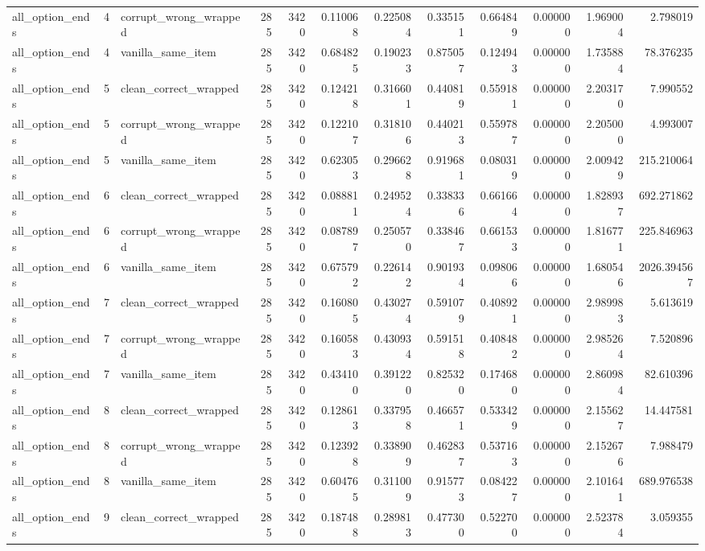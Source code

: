 \begin{tabular}{lrlrrrrrrrrr}
all\_option\_ends & 4 & corrupt\_wrong\_wrapped & 285 & 3420 & 0.110068 & 0.225084 & 0.335151 & 0.664849 & 0.000000 & 1.969004 & 2.798019 \\
all\_option\_ends & 4 & vanilla\_same\_item & 285 & 3420 & 0.684825 & 0.190233 & 0.875057 & 0.124943 & 0.000000 & 1.735884 & 78.376235 \\
all\_option\_ends & 5 & clean\_correct\_wrapped & 285 & 3420 & 0.124218 & 0.316601 & 0.440819 & 0.559181 & 0.000000 & 2.203170 & 7.990552 \\
all\_option\_ends & 5 & corrupt\_wrong\_wrapped & 285 & 3420 & 0.122107 & 0.318106 & 0.440213 & 0.559787 & 0.000000 & 2.205000 & 4.993007 \\
all\_option\_ends & 5 & vanilla\_same\_item & 285 & 3420 & 0.623053 & 0.296628 & 0.919681 & 0.080319 & 0.000000 & 2.009429 & 215.210064 \\
all\_option\_ends & 6 & clean\_correct\_wrapped & 285 & 3420 & 0.088811 & 0.249524 & 0.338336 & 0.661664 & 0.000000 & 1.828937 & 692.271862 \\
all\_option\_ends & 6 & corrupt\_wrong\_wrapped & 285 & 3420 & 0.087897 & 0.250570 & 0.338467 & 0.661533 & 0.000000 & 1.816771 & 225.846963 \\
all\_option\_ends & 6 & vanilla\_same\_item & 285 & 3420 & 0.675792 & 0.226142 & 0.901934 & 0.098066 & 0.000000 & 1.680546 & 2026.394567 \\
all\_option\_ends & 7 & clean\_correct\_wrapped & 285 & 3420 & 0.160805 & 0.430274 & 0.591079 & 0.408921 & 0.000000 & 2.989983 & 5.613619 \\
all\_option\_ends & 7 & corrupt\_wrong\_wrapped & 285 & 3420 & 0.160583 & 0.430934 & 0.591518 & 0.408482 & 0.000000 & 2.985264 & 7.520896 \\
all\_option\_ends & 7 & vanilla\_same\_item & 285 & 3420 & 0.434100 & 0.391220 & 0.825320 & 0.174680 & 0.000000 & 2.860984 & 82.610396 \\
all\_option\_ends & 8 & clean\_correct\_wrapped & 285 & 3420 & 0.128613 & 0.337958 & 0.466571 & 0.533429 & 0.000000 & 2.155627 & 14.447581 \\
all\_option\_ends & 8 & corrupt\_wrong\_wrapped & 285 & 3420 & 0.123928 & 0.338909 & 0.462837 & 0.537163 & 0.000000 & 2.152676 & 7.988479 \\
all\_option\_ends & 8 & vanilla\_same\_item & 285 & 3420 & 0.604765 & 0.311009 & 0.915773 & 0.084227 & 0.000000 & 2.101641 & 689.976538 \\
all\_option\_ends & 9 & clean\_correct\_wrapped & 285 & 3420 & 0.187488 & 0.289813 & 0.477300 & 0.522700 & 0.000000 & 2.523784 & 3.059355 \\

\end{tabular}
